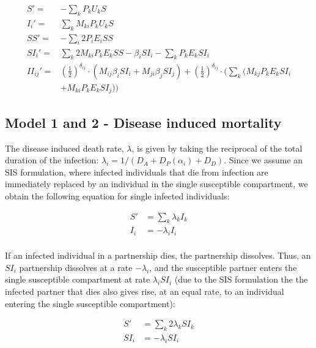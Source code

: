 \documentclass[10pt,letterpaper]{article}
\newcommand{\khalf}{\left(\frac{1}{2}\right)^{\delta_{ij}}}  %
\begin{document}
\begin{equation}
\begin{aligned}
S' =& - \sum_k P_k U_k S\\
I_i' =& \sum_k M_{ki} P_k U_k S\\
SS' =&  - \sum_i 2 P_i E_i SS \\
SI_i' =& \sum_k 2 M_{ki} P_k E_k SS - \beta_i SI_i - \sum_k P_k E_k SI_i\\
II_{ij}' =& \khalf \cdot (M_{ij} \beta_i SI_i + M_{ji} \beta_j SI_j) + \khalf \cdot (\sum_k (M_{kj} P_k E_k SI_i\\
&+ M_{ki} P_k E_k SI_j))
\end{aligned}
\end{equation}

\subsection*{Model 1 and 2 - Disease induced mortality}

The disease induced death rate, $\lambda$, is given by taking the reciprocal of the total duration of the infection: $\lambda_i = 1/(D_A + D_P(\alpha_i) + D_D)$. Since we assume an SIS formulation, where infected individuals that die from infection are immediately replaced by an individual in the single susceptible compartment, we obtain the following equation for single infected individuals:

\begin{equation}
\begin{aligned}
S' &= \sum_k \lambda_k I_k \\
I_i &= - \lambda_i I_i \\
\end{aligned}
\end{equation}

If an infected individual in a partnership dies, the partnership dissolves. Thus, an $SI_i$ partnership dissolves at a rate $-\lambda_i$, and the susceptible partner enters the single susceptible compartment at rate $\lambda_i SI_i$ (due to the SIS formulation the the infected partner that dies also gives rise, at an equal rate, to an individual entering the single susceptible compartment):

\begin{equation}
\begin{aligned}
S' &= \sum_k 2 \lambda_k SI_k \\
SI_i &= - \lambda_i SI_i 
\end{aligned}
\end{equation}
\end{document}
